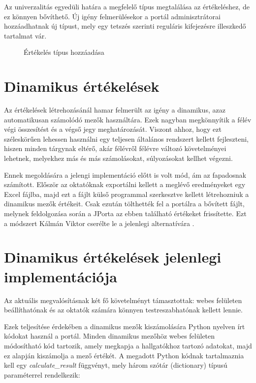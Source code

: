 Az univerzalitás egyedüli határa a megfelelő típus megtalálása az értékeléshez, de ez könnyen bővíthető. Új igény felmerülésekor a portál adminisztrátorai hozzáadhatnak új típust, mely egy tetszés szerinti reguláris kifejezésre illeszkedő tartalmat vár.

\begin{figure}[p]
    \centering
    \caption{Értékelés típus hozzáadása}
    \label{fig:jporta_add_result}
\end{figure}

\section{Dinamikus értékelések}\label{section:dynamic-assessments}

Az értékelések létrehozásánál hamar felmerült az igény a dinamikus, azaz automatikusan számolódó mezők használtára. Ezek nagyban megkönnyítik a félév végi összesítést és a végső jegy meghatározását. Viszont ahhoz, hogy ezt széleskörűen lehessen használni egy teljesen általános rendszert kellett fejleszteni, hiszen minden tárgynak eltérő, akár félévről félévre változó követelményei lehetnek, melyekhez más és más számolásokat, súlyozásokat kellhet végezni. 

Ennek megoldására a jelengi implementáció előtt is volt mód, ám az fapadosnak számított. Először az oktatóknak exportálni kellett a meglévő eredményeket egy Excel fájlba, majd ezt a fájlt külső programmal szerkesztve kellett létrehozniuk a dinamikus mezők értékeit. Csak ezután tölthették fel a portálra a bővített fájlt, melynek feldolgozása során a JPorta az ebben található értékeket frissítette. Ezt a módszert Kálmán Viktor cserélte le a jelenlegi alternatívára \cite{KalmanMsc}.

\section{Dinamikus értékelések jelenlegi implementációja}\label{section:dynamic-assessments-impl}
Az aktuális megvalósításnak két fő követelményt támasztottak: webes felületen beállíthatónak és az oktatók számára könnyen testreszabhatónak kellett lennie.

Ezek teljesítése érdekében a dinamikus mezők kiszámolására Python nyelven írt kódokat használ a portál. Minden dinamikus mezőhöz webes felületen módosítható kód tartozik, amely megkapja a hallgatókhoz tartozó adatokat, majd ez alapján kiszámolja a mező értékét. A megadott Python kódnak tartalmaznia kell egy \textit{calculate\_result} függvényt, mely három szótár (dictionary) típusú paraméterrel rendelkezik:

